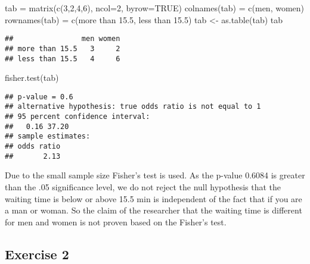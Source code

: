 \documentclass[
]{article}
\newenvironment{Shaded}{\begin{snugshade}}{\end{snugshade}}
\newcommand{\AttributeTok}[1]{\textcolor[rgb]{0.77,0.63,0.00}{#1}}
\newcommand{\ConstantTok}[1]{\textcolor[rgb]{0.00,0.00,0.00}{#1}}
\newcommand{\DecValTok}[1]{\textcolor[rgb]{0.00,0.00,0.81}{#1}}
\newcommand{\FunctionTok}[1]{\textcolor[rgb]{0.00,0.00,0.00}{#1}}
\newcommand{\NormalTok}[1]{#1}
\newcommand{\OtherTok}[1]{\textcolor[rgb]{0.56,0.35,0.01}{#1}}
\newcommand{\StringTok}[1]{\textcolor[rgb]{0.31,0.60,0.02}{#1}}
\begin{document}
\begin{Shaded}
\begin{Highlighting}[]
\NormalTok{tab }\OtherTok{=} \FunctionTok{matrix}\NormalTok{(}\FunctionTok{c}\NormalTok{(}\DecValTok{3}\NormalTok{,}\DecValTok{2}\NormalTok{,}\DecValTok{4}\NormalTok{,}\DecValTok{6}\NormalTok{), }\AttributeTok{ncol=}\DecValTok{2}\NormalTok{, }\AttributeTok{byrow=}\ConstantTok{TRUE}\NormalTok{)}
\FunctionTok{colnames}\NormalTok{(tab) }\OtherTok{=} \FunctionTok{c}\NormalTok{(}\StringTok{\textquotesingle{}men\textquotesingle{}}\NormalTok{, }\StringTok{\textquotesingle{}women\textquotesingle{}}\NormalTok{)}
\FunctionTok{rownames}\NormalTok{(tab) }\OtherTok{=} \FunctionTok{c}\NormalTok{(}\StringTok{\textquotesingle{}more than 15.5\textquotesingle{}}\NormalTok{, }\StringTok{\textquotesingle{}less than 15.5\textquotesingle{}}\NormalTok{)}
\NormalTok{tab }\OtherTok{\textless{}{-}} \FunctionTok{as.table}\NormalTok{(tab)}
\NormalTok{tab}
\end{Highlighting}
\end{Shaded}

\begin{verbatim}
##                men women
## more than 15.5   3     2
## less than 15.5   4     6
\end{verbatim}

\begin{Shaded}
\begin{Highlighting}[]
\FunctionTok{fisher.test}\NormalTok{(tab)}
\end{Highlighting}
\end{Shaded}

\begin{verbatim}
## p-value = 0.6
## alternative hypothesis: true odds ratio is not equal to 1
## 95 percent confidence interval:
##   0.16 37.20
## sample estimates:
## odds ratio 
##       2.13
\end{verbatim}

Due to the small sample size Fisher's test is used. As the p-value
0.6084 is greater than the .05 significance level, we do not reject the
null hypothesis that the waiting time is below or above 15.5 min is
independent of the fact that if you are a man or woman. So the claim of
the researcher that the waiting time is different for men and women is
not proven based on the Fisher's test.

\hypertarget{exercise-2}{%
\subsection{Exercise 2}\label{exercise-2}}
\end{document}

